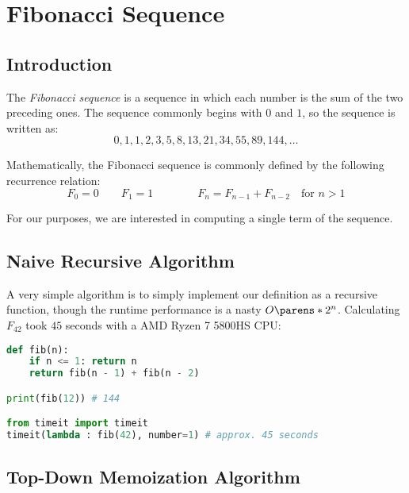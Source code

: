 \section{Fibonacci Sequence}%
\label{sec:fibonacci-sequence}


\subsection{Introduction}%

The \emph{Fibonacci sequence} is a sequence in which each number is the sum of the two preceding ones. The sequence commonly begins with $0$ and $1$, so the sequence is written as:
\begin{equation*}
    0, 1, 1, 2, 3, 5, 8, 13, 21, 34, 55, 89, 144, \dots
\end{equation*}

Mathematically, the Fibonacci sequence is commonly defined by the following recurrence relation:
\begin{equation*}
    F_0 = 0
    \qquad
    F_1 = 1
    \qquad\qquad
    F_n = F_{n - 1} + F_{n - 2}
    \quad \text{for } n > 1
\end{equation*}

For our purposes, we are interested in computing a single term of the sequence.


\subsection{Naive Recursive Algorithm}

A very simple algorithm is to simply implement our definition as a recursive function, though the runtime performance is a nasty $O \parens*{2^n}$. Calculating $F_{42}$ took $45$ seconds with a AMD Ryzen 7 5800HS CPU:
\begin{lstlisting}[language={python}, caption={Python code for a naive recursion algorithm. Time: $O \parens*{2^n}$.}]
def fib(n):
    if n <= 1: return n
    return fib(n - 1) + fib(n - 2)

print(fib(12)) # 144

from timeit import timeit
timeit(lambda : fib(42), number=1) # approx. 45 seconds
\end{lstlisting}


\subsection{Top-Down Memoization Algorithm}

